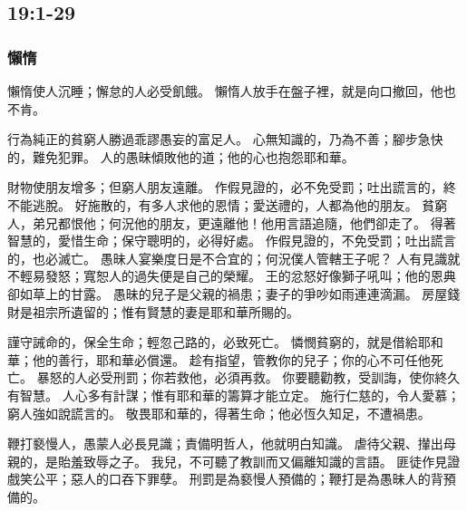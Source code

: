 \subsection{  19:1-29}
\subsubsection{懶惰}
懶惰使人沉睡；懈怠的人必受飢餓。
懶惰人放手在盤子裡，就是向口撤回，他也不肯。


行為純正的貧窮人勝過乖謬愚妄的富足人。
心無知識的，乃為不善；腳步急快的，難免犯罪。
人的愚昧傾敗他的道；他的心也抱怨耶和華。


財物使朋友增多；但窮人朋友遠離。
作假見證的，必不免受罰；吐出謊言的，終不能逃脫。
好施散的，有多人求他的恩情；愛送禮的，人都為他的朋友。
貧窮人，弟兄都恨他；何況他的朋友，更遠離他！他用言語追隨，他們卻走了。
得著智慧的，愛惜生命；保守聰明的，必得好處。
作假見證的，不免受罰；吐出謊言的，也必滅亡。
愚昧人宴樂度日是不合宜的；何況僕人管轄王子呢？
人有見識就不輕易發怒；寬恕人的過失便是自己的榮耀。
王的忿怒好像獅子吼叫；他的恩典卻如草上的甘露。
愚昧的兒子是父親的禍患；妻子的爭吵如雨連連滴漏。
房屋錢財是祖宗所遺留的；惟有賢慧的妻是耶和華所賜的。

謹守誡命的，保全生命；輕忽己路的，必致死亡。
憐憫貧窮的，就是借給耶和華；他的善行，耶和華必償還。
趁有指望，管教你的兒子；你的心不可任他死亡。
暴怒的人必受刑罰；你若救他，必須再救。
你要聽勸教，受訓誨，使你終久有智慧。
人心多有計謀；惟有耶和華的籌算才能立定。
施行仁慈的，令人愛慕；窮人強如說謊言的。
敬畏耶和華的，得著生命；他必恆久知足，不遭禍患。

鞭打褻慢人，愚蒙人必長見識；責備明哲人，他就明白知識。
虐待父親、攆出母親的，是貽羞致辱之子。
我兒，不可聽了教訓而又偏離知識的言語。
匪徒作見證戲笑公平；惡人的口吞下罪孽。
刑罰是為褻慢人預備的；鞭打是為愚昧人的背預備的。

